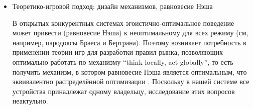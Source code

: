 \begin{itemize}
\item Теоретико-игровой подход: дизайн механизмов, равновесие Нэша

В открытых конкурентных системах эгоистично-оптимальное поведение может привести (равновесие Нэша) к неоптимальному для всех режиму (см, например, пародоксы Браеса и Бертрана).
Поэтому возникает потребность в применении теории игр для разработки правил рынка, позволяющих оптимально работать по механизму ``think locally, act globally'', то есть получить механизм, в котором равновесие Нэша является оптимальным, что эквивалентно распределённой оптимизации \cite{li2013designing}.
Поскольку в нашей системе все устройства принадлежат одному владельцу, исследование этих вопросов неактульно.



    
    
    
    
        

\end{itemize}
